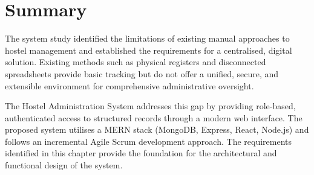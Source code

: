 \section{Summary}

The system study identified the limitations of existing manual approaches to hostel management and established the requirements for a centralised, digital solution. Existing methods such as physical registers and disconnected spreadsheets provide basic tracking but do not offer a unified, secure, and extensible environment for comprehensive administrative oversight.

The Hostel Administration System addresses this gap by providing role-based, authenticated access to structured records through a modern web interface. The proposed system utilises a MERN stack (MongoDB, Express, React, Node.js) and follows an incremental Agile Scrum development approach. The requirements identified in this chapter provide the foundation for the architectural and functional design of the system.
